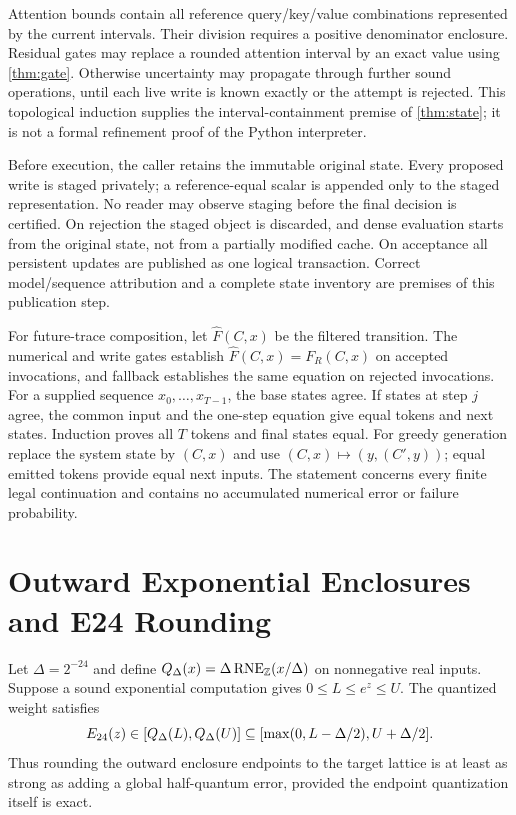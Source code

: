 Attention bounds contain all reference query/key/value combinations
represented by the current intervals. Their division requires a positive
denominator enclosure. Residual gates may replace a rounded attention
interval by an exact value using \cref{thm:gate}. Otherwise uncertainty may
propagate through further sound operations, until each live write is known
exactly or the attempt is rejected. This topological induction supplies the
interval-containment premise of \cref{thm:state}; it is not a formal
refinement proof of the Python interpreter.

Before execution, the caller retains the immutable original state.
Every proposed write is staged privately; a reference-equal scalar is
appended only to the staged representation. No reader may observe staging
before the final decision is certified. On rejection the staged object is
discarded, and dense evaluation starts from the original state, not from a
partially modified cache. On acceptance all persistent updates are
published as one logical transaction. Correct model/sequence attribution
and a complete state inventory are premises of this publication step.

For future-trace composition, let $\widehat F(C,x)$ be the filtered
transition. The numerical and write gates establish
$\widehat F(C,x)=F_R(C,x)$ on accepted invocations, and fallback establishes
the same equation on rejected invocations. For a supplied sequence
$x_0,\ldots,x_{T-1}$, the base states agree. If states at step $j$ agree,
the common input and the one-step equation give equal tokens and next
states. Induction proves all $T$ tokens and final states equal. For greedy
generation replace the system state by $(C,x)$ and use
$(C,x)\mapsto(y,(C',y))$; equal emitted tokens provide equal next inputs.
The statement concerns every finite legal continuation and contains no
accumulated numerical error or failure probability.

\section{Outward Exponential Enclosures and E24 Rounding}
\label{app:lattice}

Let $\Delta=2^{-24}$ and define
$Q_\Delta(x)=\Delta\operatorname{RNE}_{\mathbb Z}(x/\Delta)$ on nonnegative real
inputs. Suppose a sound exponential computation gives
$0\le L\le e^z\le U$. The quantized weight satisfies
\begin{equation}
 E_{24}(z)\in[Q_\Delta(L),Q_\Delta(U)]
 \subseteq[\max(0,L-\Delta/2),U+\Delta/2].
 \label{eq:lattice}
\end{equation}
Thus rounding the outward enclosure endpoints to the target lattice is
at least as strong as adding a global half-quantum error, provided the
endpoint quantization itself is exact.

